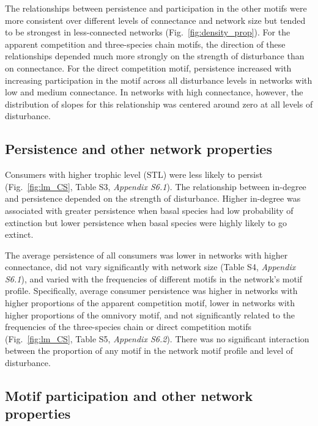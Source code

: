 \documentclass[12pt]{article}
\begin{document}
\begin{spacing}{1.0}
        The relationships between persistence and participation in the other motifs were more consistent over different levels of connectance and network size but tended to be strongest in less-connected networks (Fig.~\ref{fig:density_prop}).
        For the apparent competition and three-species chain motifs, the direction of these relationships depended much more strongly on the strength of disturbance than on connectance.
        For the direct competition motif, persistence increased with increasing participation in the motif across all disturbance levels in networks with low and medium connectance.
        In networks with high connectance, however, the distribution of slopes for this relationship was centered around zero at all levels of disturbance.


    \subsection*{Persistence and other network properties}

       Consumers with higher trophic level (STL) were less likely to persist (Fig.~\ref{fig:lm_CS}, Table S3, \emph{Appendix S6.1}).
        The relationship between in-degree and persistence depended on the strength of disturbance.
        Higher in-degree was associated with greater persistence when basal species had low probability of extinction but lower persistence when basal species were highly likely to go extinct.


        The average persistence of all consumers was lower in networks with higher connectance, did not vary significantly with network size (Table S4, \emph{Appendix S6.1}), and  varied with the frequencies of different motifs in the network's motif profile.
        Specifically, average consumer persistence was higher in networks with higher proportions of the apparent competition motif, lower in networks with higher proportions of the omnivory motif, and not significantly related to the frequencies of the three-species chain or direct competition motifs (Fig.~\ref{fig:lm_CS}, Table S5, \emph{Appendix S6.2}).
        There was no significant interaction between the proportion of any motif in the network motif profile and level of disturbance.


    \subsection*{Motif participation and other network properties}



\end{spacing}
\end{document}
